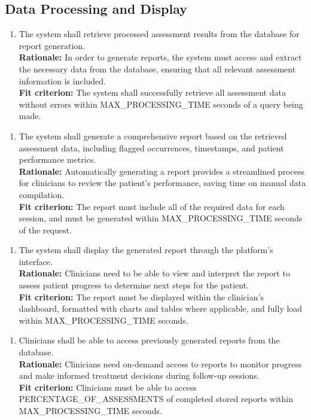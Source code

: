 \documentclass[12pt]{article}
\begin{document}
\subsection{Data Processing and Display}
\begin{enumerate}[label={FR-DPD}1. ]
  \item The system shall retrieve processed assessment results from the database for report generation.\\
  \textbf{Rationale: }In order to generate reports, the system must access and extract the necessary data from the database, ensuring that all relevant assessment information is included.\\
  \textbf{Fit criterion: }The system shall successfully retrieve all assessment data without errors within MAX\_PROCESSING\_TIME seconds of a query being made.
\end{enumerate}
\begin{enumerate}[label={FR-DPD}2. ]
  \item The system shall generate a comprehensive report based on the retrieved assessment data, including flagged occurrences, timestamps, and patient performance metrics.\\
  \textbf{Rationale: }Automatically generating a report provides a streamlined process for clinicians to review the patient’s performance, saving time on manual data compilation.\\
  \textbf{Fit criterion: }The report must include all of the required data for each session, and must be generated within MAX\_PROCESSING\_TIME seconds of the request.
\end{enumerate}
\begin{enumerate}[label={FR-DPD}3. ]
  \item The system shall display the generated report through the platform’s interface.\\
  \textbf{Rationale: }Clinicians need to be able to view and interpret the report to assess patient progress to determine next steps for the patient.\\
  \textbf{Fit criterion: }The report must be displayed within the clinician's dashboard, formatted with charts and tables where applicable, and fully load within MAX\_PROCESSING\_TIME seconds.
\end{enumerate}
\begin{enumerate}[label={FR-DPD}4. ]
  \item Clinicians shall be able to access previously generated reports from the database.\\
  \textbf{Rationale: }Clinicians need on-demand access to reports to monitor progress and make informed treatment decisions during follow-up sessions.\\
  \textbf{Fit criterion: }Clinicians must be able to access PERCENTAGE\_OF\_ASSESSMENTS of completed stored reports within MAX\_PROCESSING\_TIME seconds.  
\end{enumerate}
\end{document}
